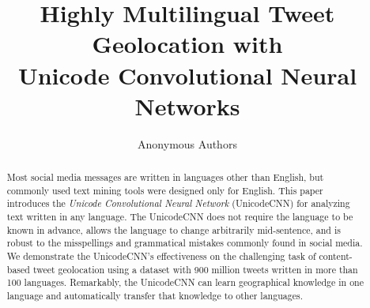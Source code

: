 \documentclass[sigconf,anonymous,review,10pt]{acmart}
\title{Highly Multilingual Tweet Geolocation with \\ Unicode Convolutional Neural Networks}
\author{Anonymous Authors}
\affiliation{}
\newcommand{\defn}[1]{\textit{#1}}
\newcommand{\fixme}[1]{\textcolor{red}{\textbf{FIXME:} {#1}}}
\begin{document}
\begin{abstract}
    Most social media messages are written in languages other than English,
    but commonly used text mining tools were designed only for English.
    This paper introduces the \defn{Unicode Convolutional Neural Network} (UnicodeCNN) for analyzing text written in any language.
    The UnicodeCNN does not require the language to be known in advance,
    allows the language to change arbitrarily mid-sentence,
    and is robust to the misspellings and grammatical mistakes commonly found in social media.
    We demonstrate the UnicodeCNN's effectiveness on the challenging task of content-based tweet geolocation using a dataset with 900 million tweets written in more than 100 languages.
    Remarkably, the UnicodeCNN can learn geographical knowledge in one language and automatically transfer that knowledge to other languages.


\end{abstract}
\end{document}
